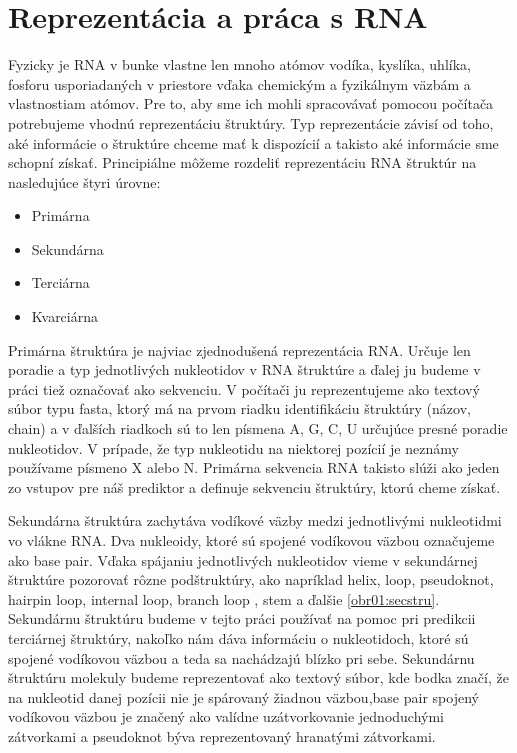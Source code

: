 \section{Reprezentácia a práca s RNA}
Fyzicky je RNA v bunke vlastne len mnoho atómov vodíka, kyslíka, uhlíka, fosforu usporiadaných v priestore vďaka chemickým a fyzikálnym väzbám a vlastnostiam atómov. Pre to, aby sme ich mohli spracovávať pomocou počítača potrebujeme vhodnú reprezentáciu štruktúry.
Typ reprezentácie závisí od toho, aké informácie o štruktúre chceme mať k dispozícií a takisto aké informácie sme schopní získať. Principiálne môžeme rozdeliť reprezentáciu RNA štruktúr na nasledujúce štyri úrovne:


\begin{itemize}
\item Primárna
\item Sekundárna
\item Terciárna
\item Kvarciárna
\end{itemize}


\indent Primárna štruktúra je najviac zjednodušená reprezentácia RNA. Určuje len poradie a typ jednotlivých nukleotidov v RNA štruktúre a ďalej ju budeme v práci tiež označovať ako sekvenciu. V počítači ju reprezentujeme ako textový súbor typu fasta, ktorý má na prvom riadku identifikáciu štruktúry (názov, chain) a v ďalších riadkoch sú to len písmena A, G, C, U určujúce presné poradie nukleotidov. V prípade, že typ nukleotidu na niektorej pozícií je neznámy používame písmeno X alebo N. Primárna sekvencia RNA takisto slúži ako jeden zo vstupov pre náš prediktor a definuje sekvenciu štruktúry, ktorú cheme získať.


\indent Sekundárna štruktúra zachytáva vodíkové väzby medzi jednotlivými nukleotidmi vo vlákne RNA. Dva nukleoidy, ktoré sú spojené vodíkovou väzbou označujeme ako base pair. Vďaka spájaniu jednotlivých nukleotidov vieme v sekundárnej štruktúre pozorovať rôzne podštruktúry, ako napríklad helix, loop, pseudoknot, hairpin loop, internal loop, branch loop , stem a ďalšie \ref{obr01:secstru}. Sekundárnu štruktúru budeme v tejto práci používať na pomoc pri predikcii terciárnej štruktúry, nakoľko nám dáva informáciu o nukleotidoch, ktoré sú spojené vodíkovou väzbou a teda sa nachádzajú blízko pri sebe. Sekundárnu štruktúru molekuly budeme reprezentovať ako textový súbor, kde bodka značí, že na nukleotid danej pozícii nie je spárovaný žiadnou väzbou,base pair spojený vodíkovou väzbou je značený ako valídne uzátvorkovanie jednoduchými zátvorkami a pseudoknot býva reprezentovaný hranatými zátvorkami.  


